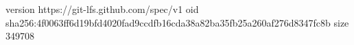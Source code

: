 version https://git-lfs.github.com/spec/v1
oid sha256:4f0063ff6d19bfd4020fad9ccdfb16cda38a82ba35fb25a260af276d8347fc8b
size 349708
